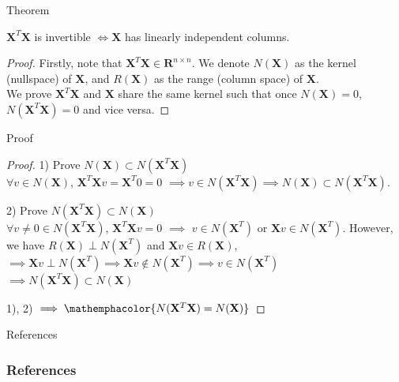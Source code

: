 \documentclass{beamer}
\begin{document}
\begin{frame}{Theorem}
    \begin{theorem}
        $\mathbf{X}^T\mathbf{X}$ is invertible $\iff \mathbf{X}$ has linearly independent columns.
    \end{theorem}\pause
    \vspace{0.2in}
    \begin{proof}
        Firstly, note that $\mathbf{X}^T\mathbf{X} \in \mathbf{R}^{n \times n}$. We denote $N(\mathbf{X})$ as the kernel (nullspace) of $\mathbf{X}$, and $R(\mathbf{X})$ as the range (column space) of $\mathbf{X}$. \\
        We prove $\mathbf{X}^T\mathbf{X}$ and $\mathbf{X}$ share the same kernel such that once $N(\mathbf{X}) = 0$, $N(\mathbf{X}^T\mathbf{X}) = 0$ and vice versa.
    \end{proof}
\end{frame}

\begin{frame}{Proof}
    \begin{proof}
        1) Prove $N(\mathbf{X}) \subset N(\mathbf{X}^T\mathbf{X})$ \\
        $\forall v \in N(\mathbf{X})$, $\mathbf{X}^T\mathbf{X}v = \mathbf{X}^T0 = 0$ $\implies v \in N(\mathbf{X}^T\mathbf{X}) \implies N(\mathbf{X}) \subset N(\mathbf{X}^T\mathbf{X})$. \\ \pause
        
        \vspace{0.2in}
        2) Prove $N(\mathbf{X}^T\mathbf{X}) \subset N(\mathbf{X})$ \\
        $\forall v\neq 0 \in N(\mathbf{X}^T\mathbf{X})$, $\mathbf{X}^T\mathbf{X}v = 0$ $\implies$ $v \in N(\mathbf{X}^T)$ or $\mathbf{X}v \in N(\mathbf{X}^T)$. However, we have $R(\mathbf{X}) \perp N(\mathbf{X}^T)$ and $\mathbf{X}v \in R(\mathbf{X})$, $\implies \mathbf{X}v \perp N(\mathbf{X}^T) \implies \mathbf{X}v \notin N(\mathbf{X}^T) \implies v \in N(\mathbf{X}^T)$
        $\implies N(\mathbf{X}^T\mathbf{X}) \subset N(\mathbf{X})$ \\ \pause
        
        \vspace{0.2in}
        1), 2) $\implies \mathemphacolor{N(\mathbf{X}^T\mathbf{X}) = N(\mathbf{X})}$
    \end{proof}
\end{frame}

\begin{frame}[allowframebreaks]{References}
\frametitle{References}
\printbibliography
\end{frame}
\end{document}
